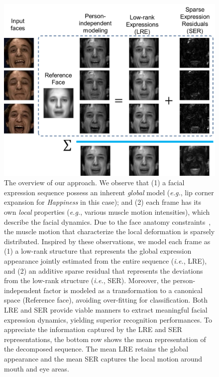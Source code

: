 \documentclass[journal]{IEEEtran}
\begin{document}
\begin{figure}[htbp]
	\centering
		\includegraphics[width=.95\columnwidth]{pics/splash.png}
	\caption{The overview of our approach. We observe that (1) a facial expression sequence possess an inherent \textit{global} model (\textit{e.g.}, lip corner expansion for \textit{Happiness} in this case); and (2) each frame has its own \textit{local} properties (\textit{e.g.}, various muscle motion intensities), which describe the facial dynamics. Due to the face anatomy constraints~\cite{Ekman78}, the muscle motion that characterize the local deformation is sparsely distributed. Inspired by these observations, we model each frame as (1) a low-rank structure that represents the global expression appearance jointly estimated from the entire sequence (\textit{i.e.}, LRE), and (2) an additive sparse residual that represents the deviations from the low-rank structure (\textit{i.e.}, SER). Moreover, the person-independent factor is modeled as a transformation to a canonical space (Reference face), avoiding over-fitting for classification. Both LRE and SER provide viable manners to extract meaningful facial expression dynamics, yielding superior recognition performances. To appreciate the information captured by the LRE and SER representations, the bottom row shows the mean representation of the decomposed sequence. The mean LRE retains the global appearance and the mean SER captures the local motion around mouth and eye areas.}
	\label{fig:splash}
\end{figure}
\end{document}
